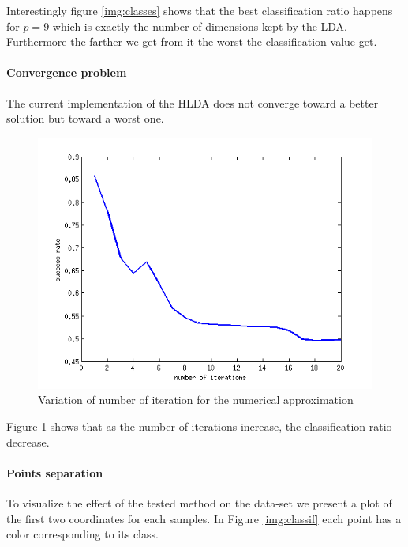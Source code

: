 Interestingly figure \ref{img:classes} shows that the best classification ratio happens for $p = 9$ which
is exactly the number of dimensions kept by the LDA. Furthermore the farther we get from
it the worst the classification value get.

\paragraph{Convergence problem} The current implementation of the HLDA does not converge toward a better
solution but toward a worst one.

\begin{figure}[H!]
  \includegraphics[scale=0.75]{img/bench-iterations}
  \caption{Variation of number of iteration for the numerical approximation}
  \label{img:iter}
\end{figure}

Figure \ref{img:iter} shows that as the number of iterations increase, the classification ratio decrease.

\paragraph{Points separation} To visualize the effect of the tested method on the data-set we present a plot
of the first two coordinates for each samples. In Figure \ref{img:classif} each point has a color corresponding to its
class.


